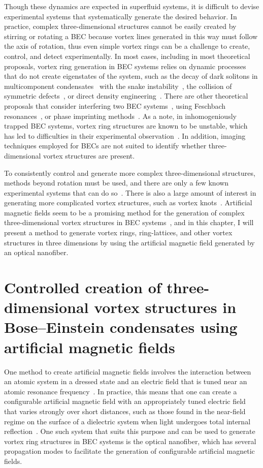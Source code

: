 Though these dynamics are expected in superfluid systems, it is difficult to devise experimental systems that systematically generate the desired behavior.
In practice, complex three-dimensional structures cannot be easily created by stirring or rotating a BEC because vortex lines generated in this way must follow the axis of rotation, thus even simple vortex rings can be a challenge to create, control, and detect experimentally.
In most cases, including in most theoretical proposals, vortex ring generation in BEC systems relies on dynamic processes that do not create eigenstates of the system, such as the decay of dark solitons in multicomponent condensates~\cite{anderson2001} with the snake instability~\cite{ruostekoski2001}, the collision of symmetric defects~\cite{ginsberg2005}, or direct density engineering~\cite{shomroni2009, ruostekoski2005}.
There are other theoretical proposals that consider interfering two BEC systems~\cite{jackson1999}, using Feschbach resonances~\cite{pinsker2013}, or phase imprinting methods~\cite{ruostekoski2001}.
As a note, in inhomogeniously trapped BEC systems, vortex ring structures are known to be unstable, which has led to difficulties in their experimental observation~\cite{abad2008}.
In addition, imaging techniques employed for BECs are not suited to identify whether three-dimensional vortex structures are present.

To consistently control and generate more complex three-dimensional structures, methods beyond rotation must be used, and there are only a few known experimental systems that can do so~\cite{anderson2001,yefsah2013}.
There is also a large amount of interest in generating more complicated vortex structures, such as vortex knots~\cite{maucher2016, kleckner2016, ricca1999}.
Artificial magnetic fields seem to be a promising method for the generation of complex three-dimensional vortex structures in BEC systems~\cite{duncan2019}, and in this chapter, I will present a method to generate vortex rings, ring-lattices, and other vortex structures in three dimensions by using the artificial magnetic field generated by an optical nanofiber.

\section{Controlled creation of three-dimensional vortex structures in Bose--Einstein condensates using artificial magnetic fields}

One method to create artificial magnetic fields involves the interaction between an atomic system in a dressed state and an electric field that is tuned near an atomic resonance frequency~\cite{dalibard2011}.
In practice, this means that one can create a configurable artificial magnetic field with an appropriately tuned electric field that varies strongly over short distances, such as those found in the near-field regime on the surface of a dielectric system when light undergoes total internal reflection~\cite{mochol2015}.
One such system that suits this purpose and can be used to generate vortex ring structures in BEC systems is the optical nanofiber, which has several propagation modes to facilitate the generation of configurable artificial magnetic fields.


